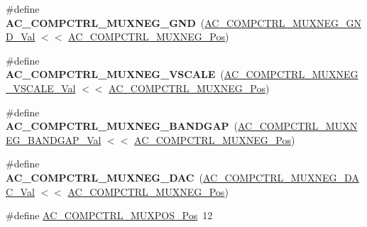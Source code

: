 \begin{DoxyCompactItemize}
\item 
\hypertarget{group___s_a_m_l21___a_c_gab1264760bb8bf09ad6eef70090b1ecdd}{}\#define {\bfseries A\+C\+\_\+\+C\+O\+M\+P\+C\+T\+R\+L\+\_\+\+M\+U\+X\+N\+E\+G\+\_\+\+G\+N\+D}~(\hyperlink{group___s_a_m_l21___a_c_ga04da0d95ff4ac4513cfca85f607ca882}{A\+C\+\_\+\+C\+O\+M\+P\+C\+T\+R\+L\+\_\+\+M\+U\+X\+N\+E\+G\+\_\+\+G\+N\+D\+\_\+\+Val}    $<$$<$ \hyperlink{group___s_a_m_l21___a_c_gae66ccdb1fdce71c5b35d4acf2dcd5234}{A\+C\+\_\+\+C\+O\+M\+P\+C\+T\+R\+L\+\_\+\+M\+U\+X\+N\+E\+G\+\_\+\+Pos})\label{group___s_a_m_l21___a_c_gab1264760bb8bf09ad6eef70090b1ecdd}

\item 
\hypertarget{group___s_a_m_l21___a_c_gabc3e5eaec135213f9261e0bcefeff5e1}{}\#define {\bfseries A\+C\+\_\+\+C\+O\+M\+P\+C\+T\+R\+L\+\_\+\+M\+U\+X\+N\+E\+G\+\_\+\+V\+S\+C\+A\+L\+E}~(\hyperlink{group___s_a_m_l21___a_c_ga6c73eec576197476fa0e9ed08bfe24a2}{A\+C\+\_\+\+C\+O\+M\+P\+C\+T\+R\+L\+\_\+\+M\+U\+X\+N\+E\+G\+\_\+\+V\+S\+C\+A\+L\+E\+\_\+\+Val} $<$$<$ \hyperlink{group___s_a_m_l21___a_c_gae66ccdb1fdce71c5b35d4acf2dcd5234}{A\+C\+\_\+\+C\+O\+M\+P\+C\+T\+R\+L\+\_\+\+M\+U\+X\+N\+E\+G\+\_\+\+Pos})\label{group___s_a_m_l21___a_c_gabc3e5eaec135213f9261e0bcefeff5e1}

\item 
\hypertarget{group___s_a_m_l21___a_c_gaf52d9d91e15ed495a18b0ee1f6daaaa2}{}\#define {\bfseries A\+C\+\_\+\+C\+O\+M\+P\+C\+T\+R\+L\+\_\+\+M\+U\+X\+N\+E\+G\+\_\+\+B\+A\+N\+D\+G\+A\+P}~(\hyperlink{group___s_a_m_l21___a_c_gacef3eff54dde36e480ae03d0812de305}{A\+C\+\_\+\+C\+O\+M\+P\+C\+T\+R\+L\+\_\+\+M\+U\+X\+N\+E\+G\+\_\+\+B\+A\+N\+D\+G\+A\+P\+\_\+\+Val} $<$$<$ \hyperlink{group___s_a_m_l21___a_c_gae66ccdb1fdce71c5b35d4acf2dcd5234}{A\+C\+\_\+\+C\+O\+M\+P\+C\+T\+R\+L\+\_\+\+M\+U\+X\+N\+E\+G\+\_\+\+Pos})\label{group___s_a_m_l21___a_c_gaf52d9d91e15ed495a18b0ee1f6daaaa2}

\item 
\hypertarget{group___s_a_m_l21___a_c_ga252b852a7c6823da0a12602882953df3}{}\#define {\bfseries A\+C\+\_\+\+C\+O\+M\+P\+C\+T\+R\+L\+\_\+\+M\+U\+X\+N\+E\+G\+\_\+\+D\+A\+C}~(\hyperlink{group___s_a_m_l21___a_c_ga8e6a3e15110f0de0d04e4f3d91025027}{A\+C\+\_\+\+C\+O\+M\+P\+C\+T\+R\+L\+\_\+\+M\+U\+X\+N\+E\+G\+\_\+\+D\+A\+C\+\_\+\+Val}    $<$$<$ \hyperlink{group___s_a_m_l21___a_c_gae66ccdb1fdce71c5b35d4acf2dcd5234}{A\+C\+\_\+\+C\+O\+M\+P\+C\+T\+R\+L\+\_\+\+M\+U\+X\+N\+E\+G\+\_\+\+Pos})\label{group___s_a_m_l21___a_c_ga252b852a7c6823da0a12602882953df3}

\item 
\hypertarget{group___s_a_m_l21___a_c_gad4bb8c36791a0ea8139ae435b00e4365}{}\#define \hyperlink{group___s_a_m_l21___a_c_gad4bb8c36791a0ea8139ae435b00e4365}{A\+C\+\_\+\+C\+O\+M\+P\+C\+T\+R\+L\+\_\+\+M\+U\+X\+P\+O\+S\+\_\+\+Pos}~12\label{group___s_a_m_l21___a_c_gad4bb8c36791a0ea8139ae435b00e4365}


\end{DoxyCompactItemize}

